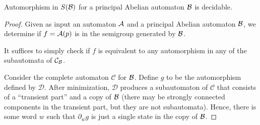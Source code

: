 \documentclass[11pt, titlepage]{article}
\begin{document}
\begin{theorem}
  Automorphism  in $S(\mathcal{B})$ for a principal Abelian
  automaton $\mathcal{B}$ is decidable.
\end{theorem}
\begin{proof}
  Given as input an automaton $\mathcal{A}$ and a principal Abelian automaton
  $\mathcal{B}$, we determine if $f = \mathcal{A}(p)$ is in the semigroup generated by
  $\mathcal{B}$.

  It suffices to simply check if $f$ is equivalent to any automorphism
  in any of the subautomata of $\mathcal{C}_{\mathcal{B}}$.

  Consider the complete automaton $\mathcal{C}$ for $\mathcal{B}$. Define $g$
  to be the automorphism defined by $\mathcal{D}$. After minimization,
  $\mathcal{D}$ produces a subautomaton of $\mathcal{C}$ that consists
  of a ``transient part'' and a copy of $\mathcal{B}$ (there may be strongly
  connected components in the transient part, but they are not
  subautomata). Hence, there is some word $w$ such that $\partial_w g$
  is just a single state in the copy of $\mathcal{B}$.



\end{proof}

{\color{TODO}


%
}
\end{document}
